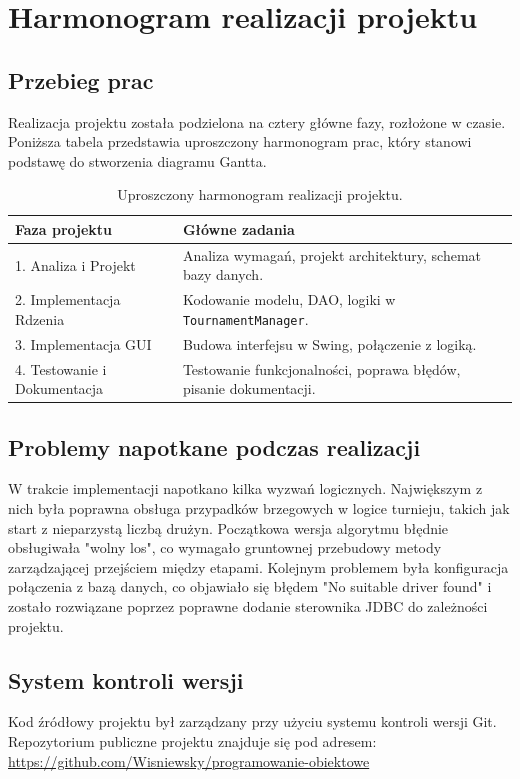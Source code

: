 \documentclass[12pt, a4paper]{article}
\begin{document}
\section{Harmonogram realizacji projektu}
\subsection{Przebieg prac}
Realizacja projektu została podzielona na cztery główne fazy, rozłożone w czasie. Poniższa tabela przedstawia uproszczony harmonogram prac, który stanowi podstawę do stworzenia diagramu Gantta.
\begin{table}[H]
\centering
\begin{tabular}{|l|p{9cm}|}
\hline
\textbf{Faza projektu} & \textbf{Główne zadania} \\ \hline
1. Analiza i Projekt & Analiza wymagań, projekt architektury, schemat bazy danych. \\ \hline
2. Implementacja Rdzenia & Kodowanie modelu, DAO, logiki w \texttt{TournamentManager}. \\ \hline
3. Implementacja GUI & Budowa interfejsu w Swing, połączenie z logiką. \\ \hline
4. Testowanie i Dokumentacja & Testowanie funkcjonalności, poprawa błędów, pisanie dokumentacji. \\ \hline
\end{tabular}
\caption{Uproszczony harmonogram realizacji projektu.}
\label{tab:harmonogram}
\end{table}

\subsection{Problemy napotkane podczas realizacji}
W trakcie implementacji napotkano kilka wyzwań logicznych. Największym z nich była poprawna obsługa przypadków brzegowych w logice turnieju, takich jak start z nieparzystą liczbą drużyn. Początkowa wersja algorytmu błędnie obsługiwała "wolny los", co wymagało gruntownej przebudowy metody zarządzającej przejściem między etapami. Kolejnym problemem była konfiguracja połączenia z bazą danych, co objawiało się błędem "No suitable driver found" i zostało rozwiązane poprzez poprawne dodanie sterownika JDBC do zależności projektu.

\subsection{System kontroli wersji}
Kod źródłowy projektu był zarządzany przy użyciu systemu kontroli wersji Git. Repozytorium publiczne projektu znajduje się pod adresem: \url{https://github.com/Wisniewsky/programowanie-obiektowe}
\end{document}
